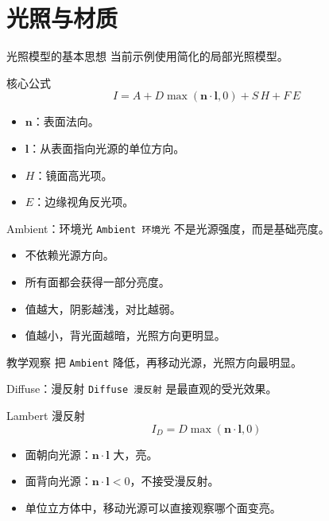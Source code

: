 \documentclass[aspectratio=169,11pt]{ctexbeamer}
\begin{document}
\section{光照与材质}

\begin{frame}{光照模型的基本思想}
  当前示例使用简化的局部光照模型。

  \begin{block}{核心公式}
    \[
    I =
    A
    + D\max(\mathbf n\cdot \mathbf l,0)
    + S\,H
    + F\,E
    \]
  \end{block}

  \begin{itemize}
    \item \(\mathbf n\)：表面法向。
    \item \(\mathbf l\)：从表面指向光源的单位方向。
    \item \(H\)：镜面高光项。
    \item \(E\)：边缘视角反光项。
  \end{itemize}
\end{frame}

\begin{frame}{Ambient：环境光}
  \texttt{Ambient 环境光} 不是光源强度，而是基础亮度。

  \begin{itemize}
    \item 不依赖光源方向。
    \item 所有面都会获得一部分亮度。
    \item 值越大，阴影越浅，对比越弱。
    \item 值越小，背光面越暗，光照方向更明显。
  \end{itemize}

  \begin{block}{教学观察}
    把 \texttt{Ambient} 降低，再移动光源，光照方向最明显。
  \end{block}
\end{frame}

\begin{frame}{Diffuse：漫反射}
  \texttt{Diffuse 漫反射} 是最直观的受光效果。

  \begin{block}{Lambert 漫反射}
    \[
    I_D = D\max(\mathbf n\cdot \mathbf l,0)
    \]
  \end{block}

  \begin{itemize}
    \item 面朝向光源：\(\mathbf n\cdot\mathbf l\) 大，亮。
    \item 面背向光源：\(\mathbf n\cdot\mathbf l<0\)，不接受漫反射。
    \item 单位立方体中，移动光源可以直接观察哪个面变亮。
  \end{itemize}
\end{frame}
\end{document}
